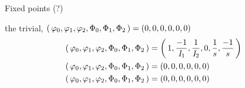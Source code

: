 \documentclass[class={myRUCProject}, crop=false]{standalone}
\begin{document}
Fixed points (?) 

the trivial, \(\left(\,\varphi_0,\varphi_1,\varphi_2,\Phi_0,\Phi_1,\Phi_2\,\right) = (0,0,0,0,0,0)\)
\begin{align*}
\left(\,\varphi_0,\varphi_1,\varphi_2,\Phi_0,\Phi_1,\Phi_2\,\right) &= \left(\,1,\frac{-1}{\mathit{I}_1},\frac{1}{\mathit{I}_2},0,\frac{1}{s},\frac{-1}{s}\,\right)\\
\left(\,\varphi_0,\varphi_1,\varphi_2,\Phi_0,\Phi_1,\Phi_2\,\right) &= (0,0,0,0,0,0)\\
\left(\,\varphi_0,\varphi_1,\varphi_2,\Phi_0,\Phi_1,\Phi_2\,\right) &= (0,0,0,0,0,0)
\end{align*}
\end{document}
